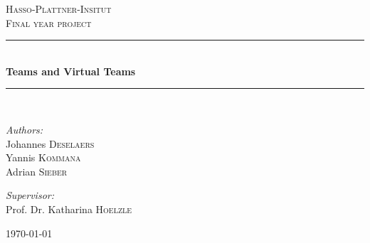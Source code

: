 \begin{titlepage}

\begin{center}



\textsc{\LARGE Hasso-Plattner-Insitut}\\[1.5cm]

\textsc{\Large Final year project}
\\[0.5cm]


\rule{\linewidth}{0.5mm} \\[0.4cm]
{ \huge \bfseries Teams and Virtual Teams}\\[0.4cm]
\rule{\linewidth}{0.5mm} \\[1.5cm]

\begin{minipage}{0.4\textwidth}
	\begin{flushleft} \large
	\emph{Authors:}\\
	Johannes \textsc{Deselaers}\\
	Yannis \textsc{Kommana}\\
	Adrian \textsc{Sieber}
	\end{flushleft}
\end{minipage}

\begin{minipage}{0.4\textwidth}
	\begin{flushright} \large
	\emph{Supervisor:} \\
	Prof. Dr. Katharina \textsc{Hoelzle}
	\end{flushright}
\end{minipage}

\vfill

{\large \today}

\end{center}

\end{titlepage}